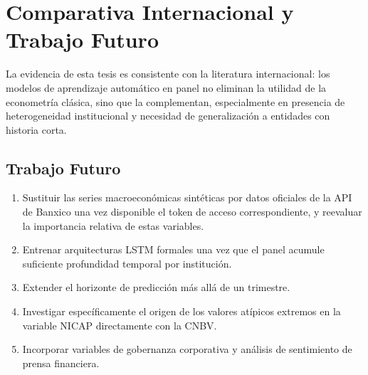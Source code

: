 \chapter{Comparativa Internacional y Trabajo Futuro}

La evidencia de esta tesis es consistente con la literatura internacional: los modelos de aprendizaje automático en panel no eliminan la utilidad de la econometría clásica, sino que la complementan, especialmente en presencia de heterogeneidad institucional y necesidad de generalización a entidades con historia corta.

\section{Trabajo Futuro}
\begin{enumerate}
    \item Sustituir las series macroeconómicas sintéticas por datos oficiales de la API de Banxico una vez disponible el token de acceso correspondiente, y reevaluar la importancia relativa de estas variables.
    \item Entrenar arquitecturas LSTM formales una vez que el panel acumule suficiente profundidad temporal por institución.
    \item Extender el horizonte de predicción más allá de un trimestre.
    \item Investigar específicamente el origen de los valores atípicos extremos en la variable NICAP directamente con la CNBV.
    \item Incorporar variables de gobernanza corporativa y análisis de sentimiento de prensa financiera.
\end{enumerate}

